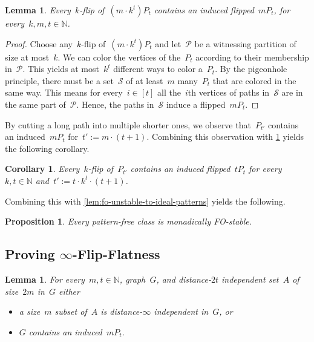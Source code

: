 \documentclass[11pt]{article}      \usepackage[margin=1in]{geometry}  \usepackage{microtype}
\newtheorem{corollary}[theorem]{Corollary}
\newtheorem{lemma}[theorem]{Lemma}
\newtheorem{proposition}[theorem]{Proposition}
\theoremstyle{definition}
\newcommand{\N}[0]{\mathrm{\mathbb{N}}}
\newcommand{\PP}{\mathcal{P}}
\renewcommand{\SS}{\mathcal{S}}
\begin{document}
\begin{lemma}\label{lem:pigeonhole-swimlane}
  Every~$k$-flip of~$(m \cdot k^t)P_t$ contains an induced flipped~$mP_t$, for every~$k,m,t \in \N$.
\end{lemma}
\begin{proof}
  Choose any~$k$-flip of~$(m \cdot k^t)P_t$ and let~$\PP$ be a witnessing partition of size at most~$k$.
  We can color the vertices of the~$P_t$ according to their membership in~$\PP$. 
  This yields at most~$k^t$ different ways to color a~$P_t$.
  By the pigeonhole principle, there must be a set~$\SS$ of at least~$m$ many~$P_t$ that are colored in the same way.
  This means for every~$i \in [t]$ all the~$i$th vertices of paths in~$\SS$ are in the same part of~$\PP$.
  Hence, the paths in~$\SS$ induce a flipped~$mP_t$.
\end{proof}

By cutting a long path into multiple shorter ones, we observe that~$P_{t'}$ contains an induced~$mP_t$ for~$t' := m \cdot (t + 1)$. 
Combining this observation with \cref{lem:pigeonhole-swimlane} yields the following corollary.

\begin{corollary}\label{lem:path-to-swimlane}
  Every~$k$-flip of~$P_{t'}$ contains an induced flipped~$tP_t$ for
  every~$k,t \in\N$ and~$t':= t \cdot k^t \cdot (t+1)$.
\end{corollary}


Combining this with \cref{lem:fo-unstable-to-ideal-patterns} yields the following.

\begin{proposition}\label{prop:pattern-free-fo-stable}
  Every pattern-free class is monadically FO-stable.
\end{proposition}

\subsection{Proving \texorpdfstring{$\infty$-Flip-Flatness}{infty-Flip-Flatness}}

\begin{lemma}\label{lem:flat-or-pattern}
  For every~$m,t\in\N$, graph~$G$, and distance-$2t$ independent set~$A$ of size~$2m$ in~$G$ either
  \begin{itemize}
    \item a size~$m$ subset of~$A$ is distance-$\infty$ independent in~$G$, or
    \item $G$ contains an induced~$mP_t$.
  \end{itemize}
  
\end{lemma}
\end{document}

